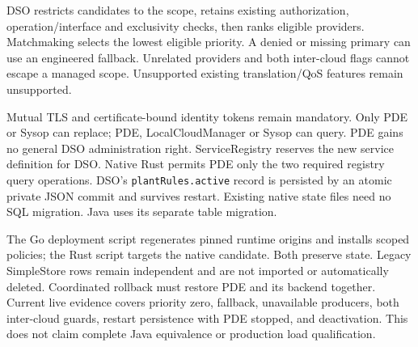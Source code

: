 \documentclass[a4paper]{arrowhead}
\begin{document}
\par\medskip
DSO restricts candidates to the scope, retains existing authorization, operation/interface and exclusivity checks, then ranks eligible providers. Matchmaking selects the lowest eligible priority. A denied or missing primary can use an engineered fallback. Unrelated providers and both inter-cloud flags cannot escape a managed scope. Unsupported existing translation/QoS features remain unsupported.
\par\medskip
Mutual TLS and certificate-bound identity tokens remain mandatory. Only PDE or Sysop can replace; PDE, LocalCloudManager or Sysop can query. PDE gains no general DSO administration right. ServiceRegistry reserves the new service definition for DSO. Native Rust permits PDE only the two required registry query operations. DSO's \texttt{plantRules.active} record is persisted by an atomic private JSON commit and survives restart. Existing native state files need no SQL migration. Java uses its separate table migration.
\par\medskip
The Go deployment script regenerates pinned runtime origins and installs scoped policies; the Rust script targets the native candidate. Both preserve state. Legacy SimpleStore rows remain independent and are not imported or automatically deleted. Coordinated rollback must restore PDE and its backend together. Current live evidence covers priority zero, fallback, unavailable producers, both inter-cloud guards, restart persistence with PDE stopped, and deactivation. This does not claim complete Java equivalence or production load qualification.
\end{document}
